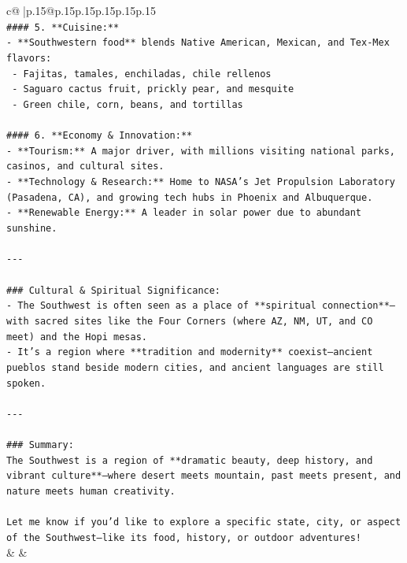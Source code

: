 \documentclass{article}
\begin{document}
{\begin{supertabular}{c@{$\;$}|p{.15\linewidth}@{}p{.15\linewidth}p{.15\linewidth}p{.15\linewidth}p{.15\linewidth}p{.15\linewidth}}
{{{\\ 
\texttt{\#\#\#\# 5. **Cuisine:**} \\
\texttt{{-} **Southwestern food** blends Native American, Mexican, and Tex{-}Mex flavors:} \\
\texttt{  {-} Fajitas, tamales, enchiladas, chile rellenos} \\
\texttt{  {-} Saguaro cactus fruit, prickly pear, and mesquite} \\
\texttt{  {-} Green chile, corn, beans, and tortillas} \\
\\ 
\texttt{\#\#\#\# 6. **Economy \& Innovation:**} \\
\texttt{{-} **Tourism:** A major driver, with millions visiting national parks, casinos, and cultural sites.} \\
\texttt{{-} **Technology \& Research:** Home to NASA’s Jet Propulsion Laboratory (Pasadena, CA), and growing tech hubs in Phoenix and Albuquerque.} \\
\texttt{{-} **Renewable Energy:** A leader in solar power due to abundant sunshine.} \\
\\ 
\texttt{{-}{-}{-}} \\
\\ 
\texttt{\#\#\# Cultural \& Spiritual Significance:} \\
\texttt{{-} The Southwest is often seen as a place of **spiritual connection**—with sacred sites like the Four Corners (where AZ, NM, UT, and CO meet) and the Hopi mesas.} \\
\texttt{{-} It’s a region where **tradition and modernity** coexist—ancient pueblos stand beside modern cities, and ancient languages are still spoken.} \\
\\ 
\texttt{{-}{-}{-}} \\
\\ 
\texttt{\#\#\# Summary:} \\
\texttt{The Southwest is a region of **dramatic beauty, deep history, and vibrant culture**—where desert meets mountain, past meets present, and nature meets human creativity.} \\
\\ 
\texttt{Let me know if you'd like to explore a specific state, city, or aspect of the Southwest—like its food, history, or outdoor adventures!} \\
            }
        }
    }
    & & \\ \\


\end{supertabular}}
\end{document}
